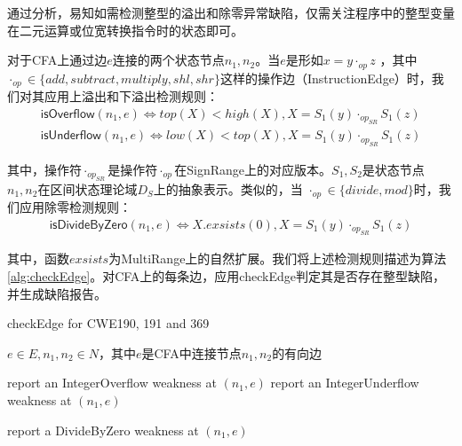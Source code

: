 通过分析，易知如需检测整型的溢出和除零异常缺陷，仅需关注程序中的整型变量在二元运算或位宽转换指令时的状态即可。

对于CFA上通过边$ e $连接的两个状态节点$ n_1, n_2 $。当$ e $是形如$ x = y \cdot_{op} z $ ，其中 $\cdot_{op} \in \{ add, subtract, multiply, shl, shr \} $这样的操作边（InstructionEdge）时，我们对其应用上溢出和下溢出检测规则：
\begin{align}
	\label{align:overflow}\mathsf{isOverflow}(n_1, e) \iff top(X) < high(X), X = S_1(y) \cdot_{op_{SR}} S_1(z)\\
	\label{align:underflow}\mathsf{isUnderflow}(n_1, e) \iff low(X) < top(X), X = S_1(y) \cdot_{op_{SR}} S_1(z)
\end{align}

其中，操作符$ \cdot_{op_{SR}} $是操作符$ \cdot_{op} $在SignRange上的对应版本。$ S_1, S_2 $是状态节点$ n_1, n_2 $在区间状态理论域$ D_S $上的抽象表示。类似的，当 $\cdot_{op} \in \{ divide, mod \} $时，我们应用除零检测规则：
\begin{align}
	\label{align:dividebyzero}\mathsf{isDivideByZero}(n_1, e) \iff X.exsists(0), X = S_1(y) \cdot_{op_{SR}} S_1(z)
\end{align}

其中，函数$ exsists $为MultiRange上的自然扩展。我们将上述检测规则描述为算法\ref{alg:checkEdge}。对CFA上的每条边，应用checkEdge判定其是否存在整型缺陷，并生成缺陷报告。

\begin{breakablealgorithm}
	\caption{checkEdge for CWE190, 191 and 369}
	\label{alg:checkEdge}
	\begin{algorithmic}[1]
		
		\Require $ e \in E, n_1, n_2 \in N$，其中$ e $是CFA中连接节点$ n_1, n_2 $的有向边
		
		
					\State report an IntegerOverflow weakness at $ (n_1, e) $
					\State report an IntegerUnderflow weakness at $ (n_1, e) $
				\EndIf
			\EndIf
			
				\State report a DivideByZero weakness at $ (n_1, e) $
			\EndIf
		
		\EndIf
				
	\end{algorithmic}
\end{breakablealgorithm}

